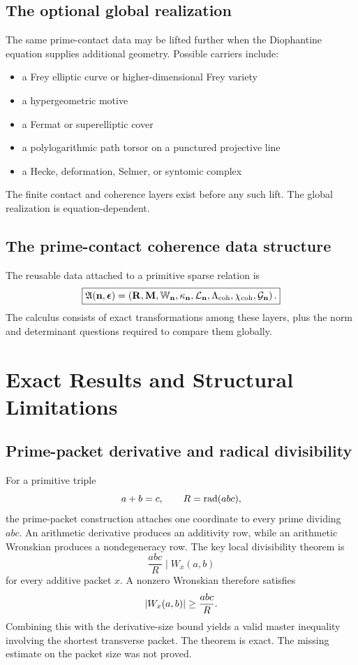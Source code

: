 \section{The optional global realization}
The same prime-contact data may be lifted further when the Diophantine equation supplies additional geometry. Possible carriers include:
\begin{itemize}[leftmargin=1.5em]
\item a Frey elliptic curve or higher-dimensional Frey variety
\item a hypergeometric motive
\item a Fermat or superelliptic cover
\item a polylogarithmic path torsor on a punctured projective line
\item a Hecke, deformation, Selmer, or syntomic complex
\end{itemize}
The finite contact and coherence layers exist before any such lift. The global realization is equation-dependent.

\section{The prime-contact coherence data structure}
The reusable data attached to a primitive sparse relation is
\[
\boxed{
\mathfrak A(\mathbf n,\boldsymbol\epsilon)
=
\left(
\mathbf R,
\mathbf M,
\mathbb W_{\mathbf n},
\kappa_{\mathbf n},
\mathcal L_{\mathbf n},
\Lambda_{\mathrm{coh}},
\chi_{\mathrm{coh}},
\mathcal G_{\mathbf n}
\right).
}
\]
The calculus consists of exact transformations among these layers, plus the norm and determinant questions required to compare them globally.

\chapter{Exact Results and Structural Limitations}

\section{Prime-packet derivative and radical divisibility}
For a primitive triple
\[
a+b=c,
\qquad
R=\operatorname{rad}(abc),
\]
the prime-packet construction attaches one coordinate to every prime dividing $abc$. An arithmetic derivative produces an additivity row, while an arithmetic Wronskian produces a nondegeneracy row. The key local divisibility theorem is
\[
\boxed{
\frac{abc}{R}
\mid
W_x(a,b)
}
\]
for every additive packet $x$. A nonzero Wronskian therefore satisfies
\[
\left|W_x(a,b)\right|\ge\frac{abc}{R}.
\]
Combining this with the derivative-size bound yields a valid master inequality involving the shortest transverse packet. The theorem is exact. The missing estimate on the packet size was not proved.

